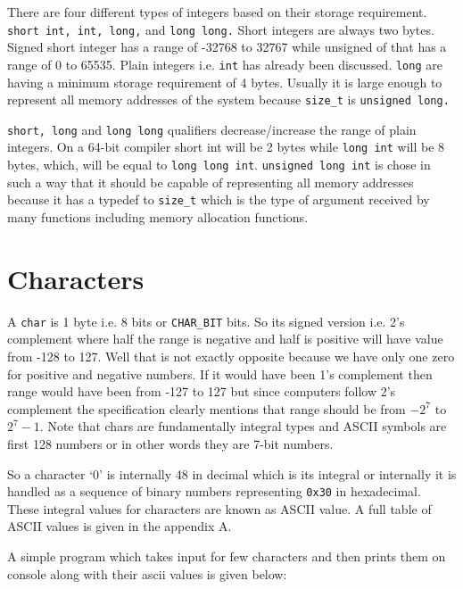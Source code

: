 There are four different types of integers based on their storage
requirement. \texttt{short int, int, long,} and \texttt{long long.} Short
integers are always two bytes. Signed short integer has a range of -32768 to
32767 while unsigned of that has a range of 0 to 65535. Plain integers
i.e. \texttt{int} has already been discussed. \texttt{long} are having a
minimum storage requirement of 4 bytes. Usually it is large enough to represent
all memory addresses of the system because \texttt{size\_t} is
\texttt{unsigned long.}

\texttt{short, long} and \texttt{long long} qualifiers decrease/increase the
range of plain integers. On a 64-bit compiler {short int} will be 2 bytes while
\texttt{long int} will be 8 bytes, which, will be equal to \texttt{long long
  int}. \texttt{unsigned long int} is chose in such a way that it should be
capable of representing all memory addresses because it has a typedef to
\texttt{size\_t} which is the type of argument received by many functions
including memory allocation functions.

\section{Characters}
A \texttt{char} is 1 byte i.e. 8 bits or \texttt{CHAR\_BIT} bits. So its signed
version i.e. 2's 
complement where half the range is negative and half is positive will have
value from -128 to 127. Well that is not exactly opposite because we have only
one zero for positive and negative numbers. If it would have been 1's
complement then range would have been from -127 to 127 but since computers
follow 2's complement the specification clearly mentions that range should be
from $-2^7$ to $2^7 - 1.$ Note that chars are fundamentally integral types and
ASCII symbols are first 128 numbers or in other words they are 7-bit numbers.

So a character `0' is internally 48 in decimal which is its integral or
internally it is handled as a sequence of binary numbers representing
\texttt{0x30} in hexadecimal. These integral values for characters are known as
ASCII value. A full table of ASCII values is given in the appendix A.

A simple program which takes input for few characters and then prints them on
console along with their ascii values is given below:

